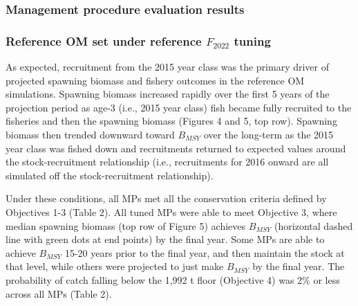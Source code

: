\documentclass[11pt]{book}
\begin{document}
\hypertarget{management-procedure-evaluation-results}{%
\subsubsection{Management procedure evaluation results}\label{management-procedure-evaluation-results}}

\hypertarget{reference-om-set-under-reference-f_2022-tuning}{%
\subsubsection{\texorpdfstring{Reference OM set under reference \(F_{2022}\) tuning}{Reference OM set under reference F\_\{2022\} tuning}}\label{reference-om-set-under-reference-f_2022-tuning}}

As expected, recruitment from the 2015 year class was the primary driver of projected spawning biomass and fishery outcomes in the reference OM simulations. Spawning biomass increased rapidly over the first 5 years of the projection period as age-3 (i.e., 2015 year class) fish became fully recruited to the fisheries and then the spawning biomass (Figures 4 and 5, top row). Spawning biomass then trended downward toward \(B_{MSY}\) over the long-term as the 2015 year class was fished down and recruitments returned to expected values around the stock-recruitment relationship (i.e., recruitments for 2016 onward are all simulated off the stock-recruitment relationship).

Under these conditions, all MPs met all the conservation criteria defined by Objectives 1-3 (Table 2). All tuned MPs were able to meet Objective 3, where median spawning biomass (top row of Figure 5) achieves \(B_{MSY}\) (horizontal dashed line with green dots at end points) by the final year. Some MPs are able to achieve \(B_{MSY}\) 15-20 years prior to the final year, and then maintain the stock at that level, while others were projected to just make \(B_{MSY}\) by the final year. The probability of catch falling below the 1,992 t floor (Objective 4) was 2\% or less across all MPs (Table 2).
\end{document}
